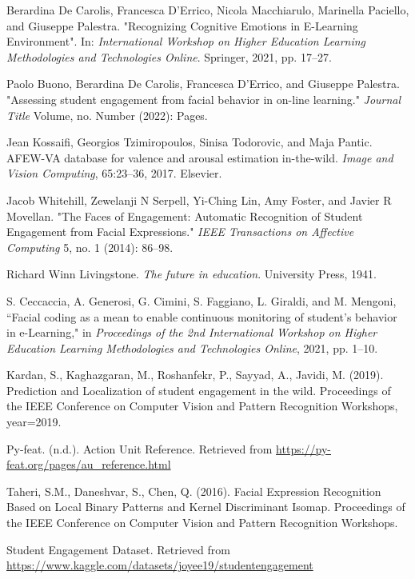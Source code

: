 \begin{thebibliography}{9}

    Berardina De Carolis, Francesca D’Errico, Nicola Macchiarulo, Marinella Paciello, and Giuseppe Palestra. 
    "Recognizing Cognitive Emotions in E-Learning Environment". In: 
    \textit{International Workshop on Higher Education Learning Methodologies and Technologies Online}. Springer, 2021, pp. 17--27.
    
    Paolo Buono, Berardina De Carolis, Francesca D'Errico, and Giuseppe Palestra.
    "Assessing student engagement from facial behavior in on-line learning."
    \textit{Journal Title} Volume, no. Number (2022): Pages.
    
    Jean Kossaifi, Georgios Tzimiropoulos, Sinisa Todorovic, and Maja Pantic.
    AFEW-VA database for valence and arousal estimation in-the-wild.
    \textit{Image and Vision Computing}, 65:23--36, 2017. Elsevier.
    
    Jacob Whitehill, Zewelanji N Serpell, Yi-Ching Lin, Amy Foster, and Javier R Movellan. 
    "The Faces of Engagement: Automatic Recognition of Student Engagement from Facial Expressions." 
    \textit{IEEE Transactions on Affective Computing} 5, no. 1 (2014): 86--98.
    
    Richard Winn Livingstone.
    \textit{The future in education}. University Press, 1941.
    
    S. Ceccaccia, A. Generosi, G. Cimini, S. Faggiano, L. Giraldi, and M. Mengoni, 
    ``Facial coding as a mean to enable continuous monitoring of student's behavior in e-Learning," in 
    \textit{Proceedings of the 2nd International Workshop on Higher Education Learning Methodologies and Technologies Online}, 2021, pp. 1--10.
    
    Kardan, S., Kaghazgaran, M., Roshanfekr, P., Sayyad, A., Javidi, M. (2019). 
    Prediction and Localization of student engagement in the wild. Proceedings of the IEEE Conference on Computer Vision and Pattern Recognition Workshops,
    year={2019}.
    
    Py-feat. (n.d.). Action Unit Reference. Retrieved from \url{https://py-feat.org/pages/au_reference.html}
    
    Taheri, S.M., Daneshvar, S., Chen, Q. (2016). 
    Facial Expression Recognition Based on Local Binary Patterns and Kernel Discriminant Isomap. 
    Proceedings of the IEEE Conference on Computer Vision and Pattern Recognition Workshops.
    
    Student Engagement Dataset. Retrieved from 
    \url{https://www.kaggle.com/datasets/joyee19/studentengagement}
    
\end{thebibliography}
